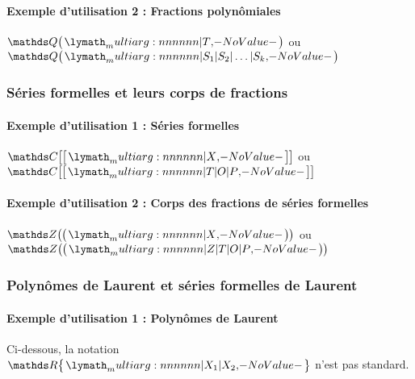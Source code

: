 \documentclass[12pt,a4paper]{article}
\theoremstyle{definition}
\begin{document}


\paragraph{Exemple d'utilisation 2 : Fractions polynômiales}

\begin{latexex}
$\setpolyfrac{\QQ}{T}$ ou
$\setpolyfrac{\QQ}%
             {S_1 | S_2 | \dots | S_k}$
\end{latexex}




\subsubsection{Séries formelles et leurs corps de fractions}

\paragraph{Exemple d'utilisation 1 : Séries formelles}

\begin{latexex}
$\setserie{\CC}{X}$ ou
$\setserie{\CC}{T | O | P}$
\end{latexex}




\paragraph{Exemple d'utilisation 2 : Corps des fractions de séries formelles}

\begin{latexex}
$\setseriefrac{\ZZ}{X}$ ou
$\setseriefrac{\ZZ}{Z | T | O | P}$
\end{latexex}




\subsubsection{Polynômes de Laurent et séries formelles de Laurent}

\paragraph{Exemple d'utilisation 1 : Polynômes de Laurent}

Ci-dessous, la notation $\setpolylaurent{\RR}{X_1 | X_2}$ n'est pas standard.
\end{document}

